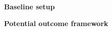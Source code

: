 \begin{frame}\textbf{Baseline setup}\vspace{0.3cm}

\begin{figure}[htp]\centering
{}
\end{figure}

\end{frame}
\begin{frame}\textbf{Potential outcome framework}\vspace{0.3cm}

\begin{figure}[htp]\centering
{}
\end{figure}

\end{frame}
